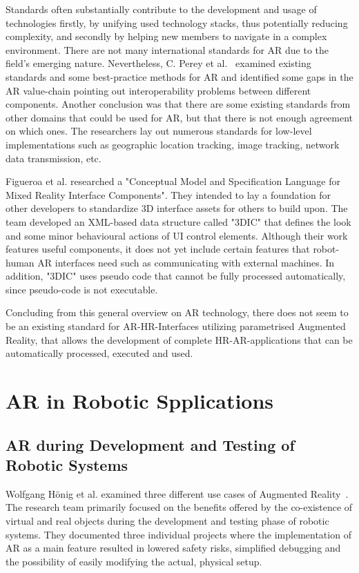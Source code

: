 Standards often substantially contribute to the development and usage of technologies firstly, by unifying used technology stacks, thus potentially reducing complexity, and secondly by helping new members to navigate in a complex environment. There are not many international standards for AR due to the field’s emerging nature. Nevertheless, C. Perey et al.~\cite{perey2011current} examined existing standards and some best-practice methods for AR and identified some gaps in the AR value-chain pointing out interoperability problems between different components. Another conclusion was that there are some existing standards from other domains that could be used for AR, but that there is not enough agreement on which ones. The researchers lay out numerous standards for low-level implementations such as geographic location tracking, image tracking, network data transmission, etc.

Figueroa et al. \cite{figueroa2006conceptual} researched a "Conceptual Model and Specification Language for Mixed Reality Interface Components". They intended to lay a foundation for other developers to standardize 3D interface assets for others to build upon. The team developed an XML-based data structure called "3DIC" that defines the look and some minor behavioural actions of UI control elements. Although their work features useful components, it does not yet include certain features that robot-human AR interfaces need such as communicating with external machines. In addition, "3DIC" uses pseudo code that cannot be fully processed automatically, since pseudo-code is not executable. 

Concluding from this general overview on AR technology, there does not seem to be an existing standard for AR-HR-Interfaces utilizing parametrised Augmented Reality, that allows the development of complete HR-AR-applications that can be automatically processed, executed and used. 

\section{AR in Robotic Spplications}
\subsection{AR during Development and Testing of Robotic Systems}
Wolfgang Hönig et al. examined three different use cases of Augmented Reality~\cite{hoenig2015mixed}. The research team primarily focused on the benefits offered by the co-existence of virtual and real objects during the development and testing phase of robotic systems. They documented three individual projects where the implementation of AR as a main feature resulted in lowered safety risks, simplified debugging and the possibility of easily modifying the actual, physical setup.

